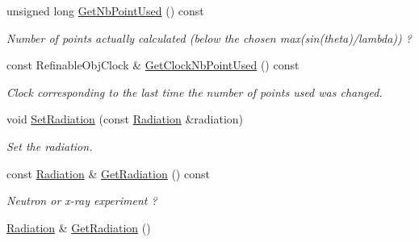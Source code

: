 \begin{DoxyCompactItemize}
unsigned long \mbox{\hyperlink{class_obj_cryst_1_1_powder_pattern_a9267c87c1e23978733d709827a6d6fc3}{Get\+Nb\+Point\+Used}} () const
\begin{DoxyCompactList}\small\item\em Number of points actually calculated (below the chosen max(sin(theta)/lambda)) ? \end{DoxyCompactList}\item 
\mbox{\label{class_obj_cryst_1_1_powder_pattern_a0cb804df8c97e4c5247fb5a166791a6e}} 
const Refinable\+Obj\+Clock \& \mbox{\hyperlink{class_obj_cryst_1_1_powder_pattern_a0cb804df8c97e4c5247fb5a166791a6e}{Get\+Clock\+Nb\+Point\+Used}} () const
\begin{DoxyCompactList}\small\item\em Clock corresponding to the last time the number of points used was changed. \end{DoxyCompactList}\item 
\mbox{\label{class_obj_cryst_1_1_powder_pattern_a78eed04935e86eded8ee11470fcb9232}} 
void \mbox{\hyperlink{class_obj_cryst_1_1_powder_pattern_a78eed04935e86eded8ee11470fcb9232}{Set\+Radiation}} (const \mbox{\hyperlink{class_obj_cryst_1_1_radiation}{Radiation}} \&radiation)
\begin{DoxyCompactList}\small\item\em Set the radiation. \end{DoxyCompactList}\item 
\mbox{\label{class_obj_cryst_1_1_powder_pattern_a8c545d3b5f5e9671a719040af2c229e3}} 
const \mbox{\hyperlink{class_obj_cryst_1_1_radiation}{Radiation}} \& \mbox{\hyperlink{class_obj_cryst_1_1_powder_pattern_a8c545d3b5f5e9671a719040af2c229e3}{Get\+Radiation}} () const
\begin{DoxyCompactList}\small\item\em Neutron or x-\/ray experiment ? \end{DoxyCompactList}\item 
\mbox{\label{class_obj_cryst_1_1_powder_pattern_a0ff01cebb572e7faade31604d3d22949}} 
\mbox{\hyperlink{class_obj_cryst_1_1_radiation}{Radiation}} \& \mbox{\hyperlink{class_obj_cryst_1_1_powder_pattern_a0ff01cebb572e7faade31604d3d22949}{Get\+Radiation}} ()

\end{DoxyCompactItemize}
